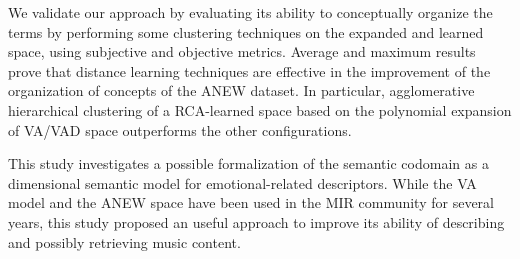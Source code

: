 We validate our approach by evaluating its ability to conceptually organize the terms by performing some clustering techniques on the expanded and learned space, using subjective and objective metrics. Average and maximum results prove that distance learning techniques are effective in the improvement of the organization of concepts of the ANEW dataset. In particular, agglomerative hierarchical clustering of a RCA-learned space based on the polynomial expansion of VA/VAD space outperforms the other configurations. 

This study investigates a possible formalization of the semantic codomain as a dimensional semantic model for emotional-related descriptors. While the VA model and the ANEW space have been used in the MIR community for several years, this study proposed an useful approach to improve its ability of describing and possibly retrieving music content.
